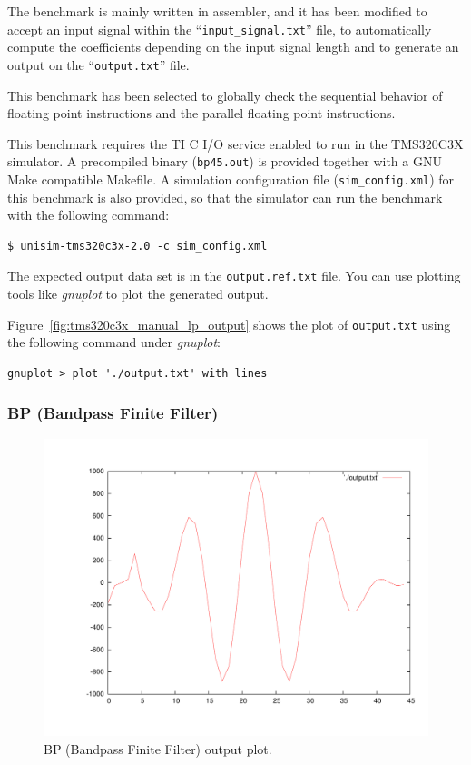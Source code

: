 The benchmark is mainly written in assembler, and it has been modified to accept an input signal within the ``\texttt{input\_signal.txt}'' file, to automatically compute the coefficients depending on the input signal length and to generate an output on the ``\texttt{output.txt}'' file.

This benchmark has been selected to globally check the sequential behavior of floating point instructions and the parallel floating point instructions.

This benchmark requires the TI C I/O service enabled to run in the TMS320C3X simulator.
A precompiled binary (\texttt{bp45.out}) is provided together with a GNU Make compatible Makefile.
A simulation configuration file (\texttt{sim\_config.xml}) for this benchmark is also provided, so that the simulator can run the benchmark with the following command:
  
\begin{verbatim}
$ unisim-tms320c3x-2.0 -c sim_config.xml
\end{verbatim}

The expected output data set is in the \texttt{output.ref.txt} file.
You can use plotting tools like \textit{gnuplot} to plot the generated output. 

Figure~\ref{fig:tms320c3x_manual_lp_output} shows the plot of \texttt{output.txt} using the following command under \textit{gnuplot}:

\begin{verbatim}
gnuplot > plot './output.txt' with lines
\end{verbatim}

\subsubsection{BP (Bandpass Finite Filter)}
\label{tms320c3x_sec:benchmarks_bp}

\begin{figure}[!h]
	\begin{center}
		\includegraphics[width=.8\textwidth]{tms320c3x/fig_bp_output.pdf}
		\caption{\label{fig:tms320c3x_manual_bp_output} BP (Bandpass Finite Filter) output plot.}
	\end{center}
\end{figure}

